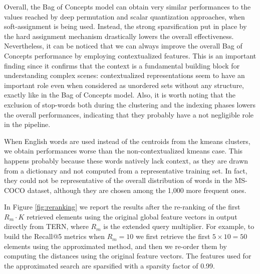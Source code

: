 \documentclass[conference]{IEEEtran}
\begin{document}
Overall, the Bag of Concepts model can obtain very similar performances to the values reached by deep permutation and scalar quantization approaches, when soft-assignment is being used. %
Instead, the strong sparsification put in place by the hard assignment mechanism drastically lowers the overall effectiveness. Nevertheless, it can be noticed that we can always improve the overall Bag of Concepts performance by employing contextualized features. This is an important finding since it confirms that the context is a fundamental building block for understanding complex scenes: contextualized representations seem to have an important role even when considered as unordered sets without any structure, exactly like in the Bag of Concepts model.
Also, it is worth noting that the exclusion of stop-words both during the clustering and the indexing phases lowers the overall performances, indicating that they probably have a not negligible role in the pipeline.

When English words are used instead of the centroids from the kmeans clusters, we obtain performances worse than the non-contextualized kmeans case. This happens probably because these words natively lack context, as they are drawn from a dictionary and not computed from a representative training set. In fact, they could not be representative of the overall distribution of words in the MS-COCO dataset, although they are chosen among the 1,000 more frequent ones.

In Figure \ref{fig:reranking} we report the results after the re-ranking of the first $R_m\cdot K$ retrieved elements using the original global feature vectors in output directly from TERN, where $R_m$ is the extended query multiplier. For example, to build the Recall@5 metrics when $R_m=10$ we first retrieve the first $5 \times 10 = 50$ elements using the approximated method, and then we re-order them by computing the distances using the original feature vectors. The features used for the approximated search are sparsified with a sparsity factor of 0.99. 
\end{document}
